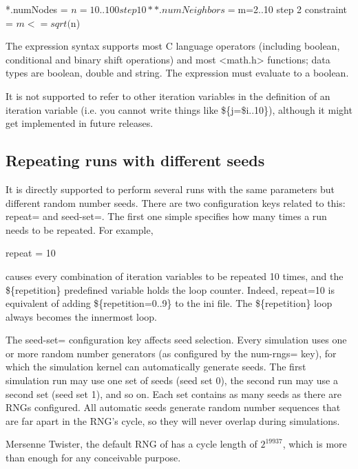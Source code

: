\begin{inifile}
*.numNodes = ${n=10..100 step 10}
**.numNeighbors = ${m=2..10 step 2}
constraint = $m <= sqrt($n)
\end{inifile}


The expression syntax supports most C language operators (including
boolean, conditional and binary shift operations) and most
<math.h> functions; data types are boolean,
double and string. The expression must evaluate to a boolean.

\begin{note}
    It is not supported to refer to other iteration variables
    in the definition of an iteration variable (i.e. you cannot write
    things like \$\{j=\$i..10\}), although it might get implemented in
    future {\opp} releases.
\end{note}

\subsection{Repeating runs with different seeds}

It is directly supported to perform several runs with the same
parameters but different random number seeds. There are two
configuration keys related to this: repeat= and seed-set=. The first
one simple specifies how many times a run needs to be repeated. For
example,

\begin{inifile}
repeat = 10
\end{inifile}

causes every combination of iteration variables to be repeated 10 times,
and the \$\{repetition\} predefined variable holds the loop counter.
Indeed, repeat=10 is equivalent of adding \$\{repetition=0..9\} to the
ini file. The \$\{repetition\} loop always becomes the innermost loop.

The seed-set= configuration key affects seed selection. Every
simulation uses one or more random number generators (as configured by
the num-rngs= key), for which the simulation kernel can automatically
generate seeds. The first simulation run may use one set of seeds (seed
set 0), the second run may use a second set (seed set 1), and so on.
Each set contains as many seeds as there are RNGs configured. All
automatic seeds generate random number sequences that are far apart in
the RNG's cycle, so they will never overlap during
simulations.

\begin{note}
Mersenne Twister, the default RNG of {\opp} has a cycle length of
$2^{19937}$, which is more than enough for any conceivable purpose.
\end{note}

